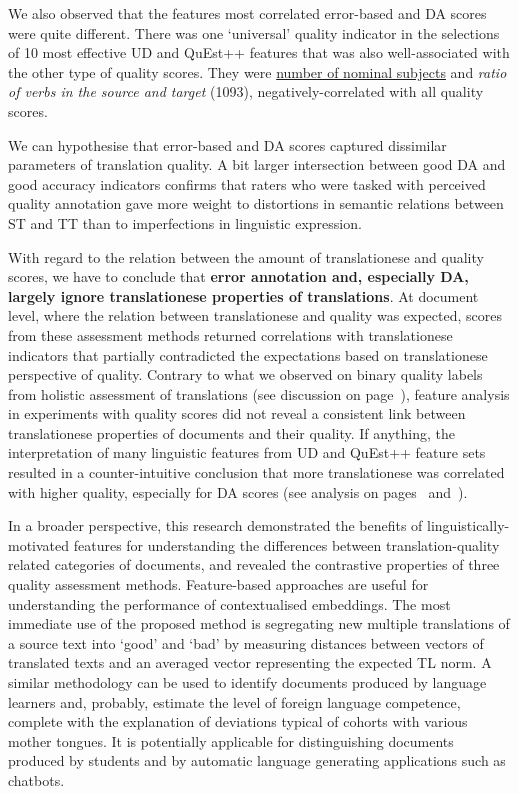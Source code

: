 We also observed that the features most correlated error-based and DA scores were quite different. There was one `universal' quality indicator in the selections of 10 most effective UD and QuEst++ features that was also well-associated with the other type of quality scores. They were \hyperlink{ft:nsubj}{number of nominal subjects} and \textit{ratio of verbs in the source and target} (1093), negatively-correlated with all quality scores.

We can hypothesise that error-based and DA scores captured dissimilar parameters of translation quality. A bit larger intersection between good DA and good accuracy indicators confirms that raters who were tasked with perceived quality annotation gave more weight to distortions in semantic relations between ST and TT than to imperfections in linguistic expression.

With regard to the relation between the amount of translationese and quality scores, we have to conclude that \textbf{error annotation and, especially DA, largely ignore translationese properties of translations}. 
At document level, where the relation between translationese and quality was expected, scores from these assessment methods returned correlations with translationese indicators that partially contradicted the expectations based on translationese perspective of quality. 
Contrary to what we observed on binary quality labels from holistic assessment of translations (see discussion on page~\pageref{pg:translationese_indicators_work_for_binary_labels}), feature analysis in experiments with quality scores did not reveal a consistent link between translationese properties of documents and their quality. 
If anything, the interpretation of many linguistic features from UD and QuEst++ feature sets resulted in a counter-intuitive conclusion that more translationese was correlated with higher quality, especially for DA scores (see analysis on pages~\pageref{pg:scores_not_translationese} and~\pageref{pg:da_ignores_translationese_feats}).

In a broader perspective, this research demonstrated the benefits of linguistically-motivated features for understanding the differences between translation-quality related categories of documents, and revealed the contrastive properties of three quality assessment methods. Feature-based approaches are useful for understanding the performance of contextualised embeddings. 
The most immediate use of the proposed method is segregating new multiple translations of a source text into `good' and `bad' by measuring distances between vectors of translated texts and an averaged vector representing the expected TL norm. 
A similar methodology can be used to identify documents produced by language learners and, probably, estimate the level of foreign language competence, complete with the explanation of deviations typical of cohorts with various mother tongues. It is potentially applicable for distinguishing documents produced by students and by automatic language generating applications such as chatbots. 
